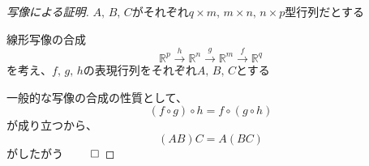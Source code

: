 \documentclass[../../../topic_linear-algebra]{subfiles}
\begin{document}
\begin{proof}[写像による証明]
  $A,\,B, \, C$がそれぞれ$q \times m, \, m \times n, \, n \times p$型行列だとする

  線形写像の合成
  \begin{equation*}
    \mathbb{R}^p \xrightarrow{h} \mathbb{R}^n \xrightarrow{g} \mathbb{R}^m \xrightarrow{f} \mathbb{R}^q
  \end{equation*}
  を考え、$f,\, g, \, h$の表現行列をそれぞれ$A, \, B, \, C$とする

  一般的な写像の合成の性質として、
  \begin{equation*}
    (f \circ g) \circ h = f \circ (g \circ h)
  \end{equation*}
  が成り立つから、
  \begin{equation*}
    (AB)C = A(BC)
  \end{equation*}
  がしたがう $\qed$
\end{proof}
\end{document}
